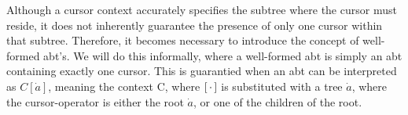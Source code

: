 \documentclass[sigplan,screen]{acmart}
\begin{document}
    

Although a cursor context accurately specifies the subtree where the cursor must reside, it does not inherently guarantee the presence of only one cursor within that subtree. Therefore, it becomes necessary to introduce the concept of well-formed abt's. We will do this informally, where a well-formed abt is simply an abt containing exactly one cursor. This is guarantied when an abt can be interpreted as $C[\dot{a}]$, meaning the context C, where $[ \, \cdot \, ]$ is substituted with a tree $\dot{a}$, where the cursor-operator is either the root $\dot{a}$, or one of the children of the root.
\end{document}
